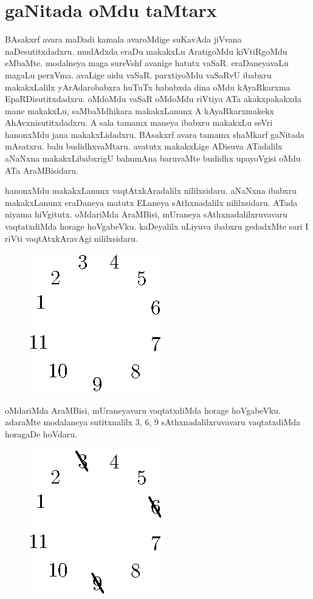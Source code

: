 \chapter{gaNitada oMdu taMtarx}


BAsakxrf avara maDadi kamala avaroMdige suKavAda jiVvana naDesutitxdadxru. mudAdxda eraDu makakxLu AratigoMdu kiVtiRgoMdu eMbaMte. modalneya maga sureVshf avanige hatutx vaSaR. eraDaneyavaLu magaLu perxVma. avaLige aidu vaSaR. parxtiyoMdu vaSaRvU ibabxru makakxLalilx yArAdarobabxra huTuTx hababxda dina oMdu kAyaRkarxma EpaRDisutitxdadxru. oMdoMdu vaSaR oMdoMdu riVtiya ATa akakxpakakxda mane makakxLu, saMbaMdhikara makakxLanunx A kAyaRkarxmakekx AhAvxnisutitxdadxru. A sala tamamx maneya ibabxru makakxLu seVri hanonxMdu jana makakxLidadxru. BAsakxrf avara tamamx shaMkarf gaNitada mAsatxru. balu budidhxvaMtaru. avatutx makakxLige ADisuva ATadalilx aNaNxna makakxLibabxrigU bahumAna baruvaMte budidhx upayoVgisi oMdu ATa AraMBisidaru.

hanonxMdu makakxLanunx vaqtAtxkAradalilx nililxsidaru. aNaNxna ibabxru makakxLanunx eraDaneya matutx ELaneya sAthxnadalilx nililxsidaru. ATada niyama hiVgitutx. oMdariMda AraMBisi, mUraneya sAthxnadalilxruvavaru vaqtatxdiMda horage hoVgabeVku. kaDeyalilx uLiyuva ibabxru gedadxMte sari I riVti vaqtAtxkAravAgi nililxsidaru.
\begin{figure}[H]
\centering
\includegraphics{src/figures/fig1.eps}
\end{figure}

oMdariMda AraMBisi, mUraneyavaru vaqtatxdiMda horage hoVgabeVku. adaraMte modalaneya sutitxnalilx $3$, $6$, $9$ sAthxnadalilxruvavaru vaqtatxdiMda horagaDe hoVdaru.
\begin{figure}[H]
\centering
\includegraphics{src/figures/fig2.eps}
\end{figure}

